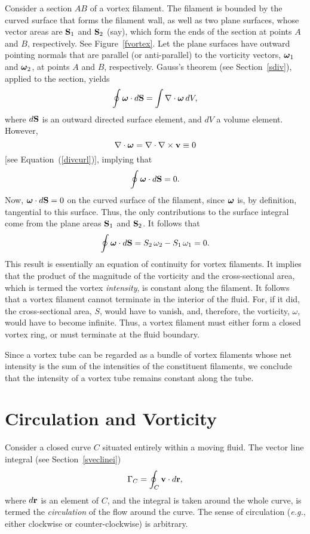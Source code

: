 Consider a section $AB$ of a vortex filament. The filament is bounded by the curved surface that forms the filament
wall, as well as two plane surfaces, whose vector areas are ${\bf S}_1$ and ${\bf S}_2$ (say), which form the ends of the section at
points $A$ and $B$, respectively. See Figure~\ref{fvortex}. Let the plane surfaces have outward pointing normals
that are parallel (or anti-parallel) to the vorticity vectors, $\mbox{\boldmath$\omega$}_1$ and $\mbox{\boldmath$\omega$}_2$, at points $A$ and $B$,
respectively.
Gauss's theorem (see Section~\ref{sdiv}), applied to the section, yields
\begin{equation}
\oint \mbox{\boldmath$\omega$} \cdot d{\bf S} = \int \nabla\cdot\mbox{\boldmath$\omega$}\,dV,
\end{equation}
where $d{\bf S}$ is an outward directed surface element, and $dV$ a volume element. However, 
\begin{equation}
\nabla\cdot\mbox{\boldmath$\omega$}=\nabla\cdot\nabla\times {\bf v} \equiv 0
\end{equation}
[see Equation~(\ref{divcurl})],
implying that
\begin{equation}
\oint \mbox{\boldmath$\omega$} \cdot d{\bf S} =0.
\end{equation}
Now, $\mbox{\boldmath$\omega$}\cdot d{\bf S}=0$ on the curved surface of the filament,
since $\mbox{\boldmath$\omega$}$ is, by definition, tangential to this surface. Thus, the only contributions to the surface integral
come from the plane areas ${\bf S}_1$ and ${\bf S}_2$. It follows that
\begin{equation}
\oint \mbox{\boldmath$\omega$} \cdot d{\bf S} = S_2\,\omega_2-S_1\,\omega_1 = 0.
\end{equation}
This result is essentially an equation of continuity for vortex filaments. It implies that the product of the
magnitude of the vorticity and the cross-sectional area, which is termed the vortex  {\em intensity}, is constant
along the filament. It follows that a vortex filament cannot terminate in the interior of the fluid. For, if
it did,  the cross-sectional area, $S$, would have to vanish, and, therefore, the vorticity, $\omega$, would have to become infinite. Thus,
a vortex filament must either form  a closed vortex ring, or must terminate at the fluid boundary. 

Since a vortex tube can be regarded as a bundle of vortex filaments whose net intensity is the sum of the
intensities of the constituent  filaments, we conclude that the intensity of a vortex tube
remains constant along the tube. 

\section{Circulation and Vorticity}\label{scirc}
Consider a closed curve $C$ situated entirely within a moving fluid.  The
vector line integral (see Section~\ref{sveclinei})
\begin{equation}
\Gamma_C = \oint_C {\bf v}\cdot d{\bf r},
\end{equation}
where $d{\bf r}$ is an element of $C$, and the integral is taken around the whole curve, is termed the {\em circulation}\/ of the flow around the curve. 
The sense of circulation ({\em e.g.}, either clockwise or counter-clockwise) is arbitrary. 

